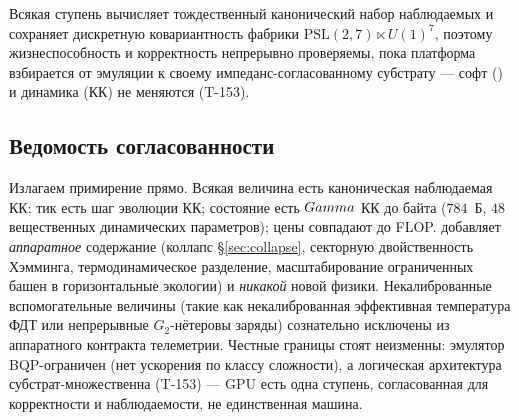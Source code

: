 \noindent Всякая ступень вычисляет тождественный канонический набор наблюдаемых
и сохраняет дискретную ковариантность фабрики $\mathrm{PSL}(2,7)\ltimes U(1)^7$,
поэтому жизнеспособность и корректность непрерывно проверяемы, пока платформа
взбирается от эмуляции к своему импеданс-согласованному субстрату --- софт
(\SYNARC{}) и динамика (КК) не меняются (T-153).

\subsection{Ведомость согласованности}
\label{subsec:ledger}

Излагаем примирение прямо. Всякая величина \TALOS{} есть каноническая
наблюдаемая КК; тик есть шаг эволюции КК; состояние есть $Gamma$ КК до байта
($784$~Б, $48$ вещественных динамических параметров); цены совпадают до FLOP.
\TALOS{} добавляет \emph{аппаратное} содержание (коллапс \S\ref{sec:collapse},
секторную двойственность Хэмминга, термодинамическое разделение, масштабирование
ограниченных башен в горизонтальные экологии) и \emph{никакой} новой физики.
Некалиброванные вспомогательные величины (такие как некалиброванная эффективная
температура ФДТ или непрерывные $G_2$-нётеровы заряды) сознательно исключены из
аппаратного контракта телеметрии. Честные границы стоят неизменны: эмулятор
BQP-ограничен (нет ускорения по классу сложности), а логическая архитектура
субстрат-множественна (T-153) --- GPU есть одна ступень, согласованная для
корректности и наблюдаемости, не единственная машина.
